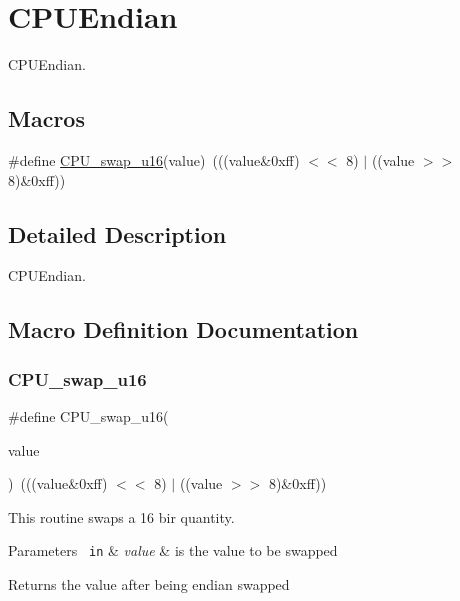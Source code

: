 \hypertarget{group__RTEMSScoreCPUBfinCPUEndian}{}\section{C\+P\+U\+Endian}
\label{group__RTEMSScoreCPUBfinCPUEndian}


C\+P\+U\+Endian.  


\subsection*{Macros}
\begin{DoxyCompactItemize}
\item 
\#define \mbox{\hyperlink{group__RTEMSScoreCPUBfinCPUEndian_ga1936ecb0107e5875a7b538374c1f621d}{C\+P\+U\+\_\+swap\+\_\+u16}}(value)~(((value\&0xff) $<$$<$ 8) $\vert$ ((value $>$$>$ 8)\&0xff))
\end{DoxyCompactItemize}


\subsection{Detailed Description}
C\+P\+U\+Endian. 



\subsection{Macro Definition Documentation}
\mbox{\label{group__RTEMSScoreCPUBfinCPUEndian_ga1936ecb0107e5875a7b538374c1f621d}} 
\subsubsection{\texorpdfstring{CPU\_swap\_u16}{CPU\_swap\_u16}}
{\footnotesize\ttfamily \#define C\+P\+U\+\_\+swap\+\_\+u16(\begin{DoxyParamCaption}\item[{}]{value }\end{DoxyParamCaption})~(((value\&0xff) $<$$<$ 8) $\vert$ ((value $>$$>$ 8)\&0xff))}

This routine swaps a 16 bir quantity.


\begin{DoxyParams}[1]{Parameters}
\mbox{\texttt{ in}}  & {\em value} & is the value to be swapped \\
\hline
\end{DoxyParams}
\begin{DoxyReturn}{Returns}
the value after being endian swapped 
\end{DoxyReturn}
